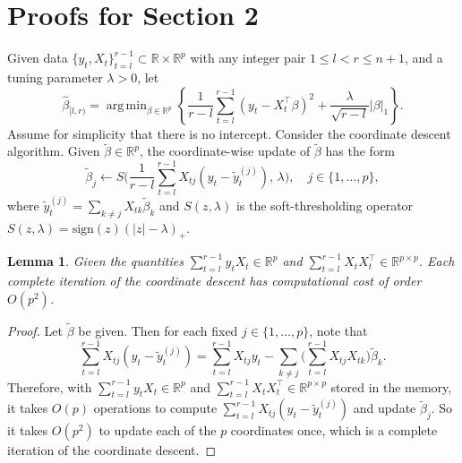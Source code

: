 \documentclass[11pt]{article}
\DeclareMathOperator*{\argmin}{arg\,min}
\theoremstyle{plain}
\newtheorem{lemma}[theorem]{Lemma}
\theoremstyle{definition}
\begin{document}
\section{Proofs for Section 2}\label{sec-app-method}

Given data $ \{y_t, X_t\}_{t=l}^{r-1} \subset \mathbb R \times \mathbb R^p$ with any integer pair $1 \leq l < r \leq n+1$, and a tuning parameter $\lambda > 0$, let 
\[
    \widehat \beta_{[l,r)} = \argmin_{\beta \in \mathbb{R}^p } \left\{\frac{1}{ r-l }\sum_{t =l}^{r-1}  (y_t  -X_t^\top \beta) ^2 +  \frac{\lambda}{\sqrt{r-l} }  |\beta |_1\right\}.
\]
Assume for simplicity that there is no intercept.  Consider the coordinate descent algorithm.  Given $\widetilde  \beta  \in \mathbb R ^p $, the coordinate-wise update of $\widetilde \beta $ has the form 
\[
    \widetilde \beta _j  \leftarrow   S \bigg(\frac{1}{r-l}\sum_{t=l}^{r-1} X_{tj} (y_t  -\widetilde y _t^{ (j) } ) , \, \lambda \bigg), \quad j \in \{1, \ldots, p\},
\]
where  $\widetilde y_t^{(j) } = \sum_{k\not =j  } X_{tk} \widetilde \beta_k$ and   $S(z,\lambda) $ is the soft-thresholding operator $S(z, \lambda) = \mathrm{sign} (z) ( |z| - \lambda)_+$.

\begin{lemma} \label{lemma:lasso one iteration}
Given the quantities $\sum_{t=l}^{r-1} y_t X_{t} \in \mathbb R^p$ and 
$\sum_{t=l}^{r-1} X_{t} X_{t}^\top   \in \mathbb R^{p\times p}$.  Each complete iteration of the coordinate descent has computational cost of order $O(p^2)$.
\end{lemma}

\begin{proof}
Let $\widetilde \beta  $ be given. Then for each fixed $j\in \{ 1,\ldots, p \}$,  note that 
$$   \sum_{t=l}^{r-1} X_{tj} (y_t  -\widetilde y _t^{ (j) } )  = \sum_{ t=l}^{r-1} X_{tj} y_t  -  \sum_{k\not = j }  \bigg( \sum_{t=l}^{r-1} X_{tj}X_{tk}\bigg) \widetilde \beta_{k} .$$
Therefore, with  $ \sum_{t=l}^{r-1} y_t X_{t}   \in \mathbb R^p$ and 
$ \sum_{t=l}^{r-1} X_{t} X_{t}^\top   \in \mathbb R^{p\times p} $ stored in the memory,
it  takes $O(p)$ operations to compute $    \sum_{t=l}^{r-1} X_{tj} (y_t  -\widetilde y _t^{ (j) } )$ and  update $\widetilde \beta_j  $. So it takes $O(p^2) $ to update each of  the $p$ coordinates once, which is   a  complete iteration of the coordinate descent.
\end{proof}
\end{document}
